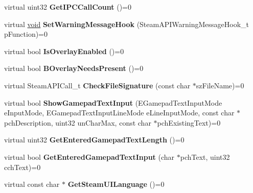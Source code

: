 \begin{DoxyCompactItemize}
\item 
\hypertarget{classISteamUtils_a3fe65aaf04da204adc13e5c569875b1b}{}virtual uint32 {\bfseries Get\+I\+P\+C\+Call\+Count} ()=0\label{classISteamUtils_a3fe65aaf04da204adc13e5c569875b1b}

\item 
\hypertarget{classISteamUtils_ab78c11723eebfc4d8d931f4e4b2bb7d8}{}virtual \hyperlink{SDL__audio_8h_a52835ae37c4bb905b903cbaf5d04b05f}{void} {\bfseries Set\+Warning\+Message\+Hook} (Steam\+A\+P\+I\+Warning\+Message\+Hook\+\_\+t p\+Function)=0\label{classISteamUtils_ab78c11723eebfc4d8d931f4e4b2bb7d8}

\item 
\hypertarget{classISteamUtils_a4daed74c0dcca45da507913a4577028c}{}virtual bool {\bfseries Is\+Overlay\+Enabled} ()=0\label{classISteamUtils_a4daed74c0dcca45da507913a4577028c}

\item 
\hypertarget{classISteamUtils_a4590d2cda9dee5626e3b438fc3678ffd}{}virtual bool {\bfseries B\+Overlay\+Needs\+Present} ()=0\label{classISteamUtils_a4590d2cda9dee5626e3b438fc3678ffd}

\item 
\hypertarget{classISteamUtils_a1baceda3ba820c08f62263523de0931f}{}virtual Steam\+A\+P\+I\+Call\+\_\+t {\bfseries Check\+File\+Signature} (const char $\ast$sz\+File\+Name)=0\label{classISteamUtils_a1baceda3ba820c08f62263523de0931f}

\item 
\hypertarget{classISteamUtils_a2a7e6ae072711fe0611dd1d6aa3ed4fa}{}virtual bool {\bfseries Show\+Gamepad\+Text\+Input} (E\+Gamepad\+Text\+Input\+Mode e\+Input\+Mode, E\+Gamepad\+Text\+Input\+Line\+Mode e\+Line\+Input\+Mode, const char $\ast$pch\+Description, uint32 un\+Char\+Max, const char $\ast$pch\+Existing\+Text)=0\label{classISteamUtils_a2a7e6ae072711fe0611dd1d6aa3ed4fa}

\item 
\hypertarget{classISteamUtils_a809a5472105c1d9175eccf7224af2d7a}{}virtual uint32 {\bfseries Get\+Entered\+Gamepad\+Text\+Length} ()=0\label{classISteamUtils_a809a5472105c1d9175eccf7224af2d7a}

\item 
\hypertarget{classISteamUtils_a487ddbbe9c404d61a445ff70d8360928}{}virtual bool {\bfseries Get\+Entered\+Gamepad\+Text\+Input} (char $\ast$pch\+Text, uint32 cch\+Text)=0\label{classISteamUtils_a487ddbbe9c404d61a445ff70d8360928}

\item 
\hypertarget{classISteamUtils_a0e22f9a75f3e869b351bb630aa3cc699}{}virtual const char $\ast$ {\bfseries Get\+Steam\+U\+I\+Language} ()=0\label{classISteamUtils_a0e22f9a75f3e869b351bb630aa3cc699}


\end{DoxyCompactItemize}
